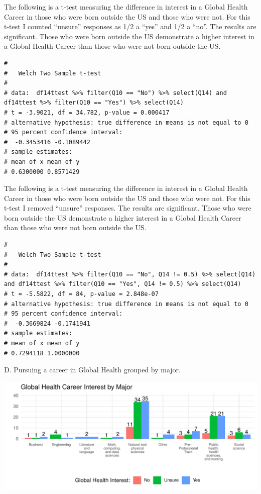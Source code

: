 \documentclass[
  letterpaper,
  DIV=11,
  numbers=noendperiod]{scrartcl}
\begin{document}
\newpage

The following is a t-test measuring the difference in interest in a
Global Health Career in those who were born outside the US and those who
were not. For this t-test I counted ``unsure'' responses as 1/2 a
``yes'' and 1/2 a ``no''. The results are significant. Those who were
born outside the US demonstrate a higher interest in a Global Health
Career than those who were not born outside the US.

\begin{verbatim}
# 
#   Welch Two Sample t-test
# 
# data:  df14ttest %>% filter(Q10 == "No") %>% select(Q14) and df14ttest %>% filter(Q10 == "Yes") %>% select(Q14)
# t = -3.9021, df = 34.782, p-value = 0.000417
# alternative hypothesis: true difference in means is not equal to 0
# 95 percent confidence interval:
#  -0.3453416 -0.1089442
# sample estimates:
# mean of x mean of y 
# 0.6300000 0.8571429
\end{verbatim}

The following is a t-test measuring the difference in interest in a
Global Health Career in those who were born outside the US and those who
were not. For this t-test I removed ``unsure'' responses. The results
are significant. Those who were born outside the US demonstrate a higher
interest in a Global Health Career than those who were not born outside
the US.

\begin{verbatim}
# 
#   Welch Two Sample t-test
# 
# data:  df14ttest %>% filter(Q10 == "No", Q14 != 0.5) %>% select(Q14) and df14ttest %>% filter(Q10 == "Yes", Q14 != 0.5) %>% select(Q14)
# t = -5.5822, df = 84, p-value = 2.848e-07
# alternative hypothesis: true difference in means is not equal to 0
# 95 percent confidence interval:
#  -0.3669824 -0.1741941
# sample estimates:
# mean of x mean of y 
# 0.7294118 1.0000000
\end{verbatim}

\newpage

D. Pursuing a career in Global Health grouped by major.

\includegraphics{GlobalHealthQuarto1-5_files/figure-pdf/unnamed-chunk-20-1.pdf}
\end{document}
